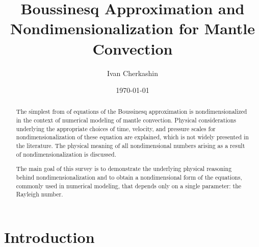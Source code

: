 \documentclass[
10pt, %
a4paper, %
oneside, %
headinclude,footinclude, %
BCOR5mm, %
]{scrartcl}
\begin{document}
\title{Boussinesq Approximation and Nondimensionalization for Mantle Convection}


\author{Ivan Cherkashin}




\date{\today}

\begin{abstract}

The simplest from of equations of the Boussinesq approximation is nondimensionalized in the context of numerical modeling of mantle convection. Physical considerations underlying the appropriate choices of time, velocity, and pressure scales for nondimensionalization of these equation are explained, which is not widely presented in the literature. The physical meaning of all nondimensional numbers arising as a result of nondimensionalization is discussed. 

The main goal of this survey is to demonstrate the underlying physical reasoning behind nondimensionalization and to obtain a nondimensional form of the equations, commonly used in numerical modeling, that depends only on a single parameter: the Rayleigh number.

\end{abstract}

\maketitle

\tableofcontents

\section*{Introduction}
\end{document}
